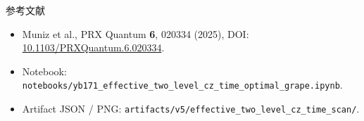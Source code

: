 \documentclass[aspectratio=169,11pt]{ctexbeamer}
\begin{document}
\begin{frame}{参考文献}
  \begin{itemize}
    \item Muniz et al., PRX Quantum \textbf{6}, 020334 (2025), DOI:
      \href{https://doi.org/10.1103/PRXQuantum.6.020334}{10.1103/PRXQuantum.6.020334}.
    \item Notebook:
      \texttt{notebooks/yb171\_effective\_two\_level\_cz\_time\_optimal\_grape.ipynb}.
    \item Artifact JSON / PNG:
      \texttt{artifacts/v5/effective\_two\_level\_cz\_time\_scan/}.
  \end{itemize}
\end{frame}
\end{document}
